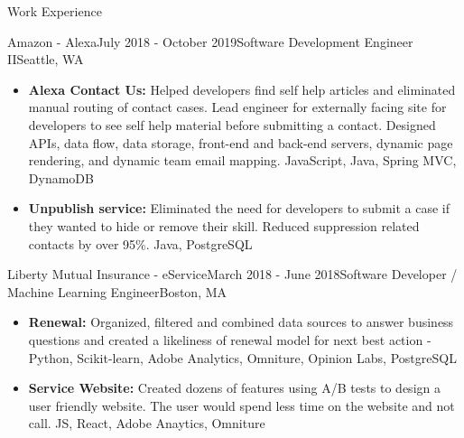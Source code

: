 \documentclass{resume} %
\begin{document}
\begin{rSection}{Work Experience}
\begin{rSubsection}{Amazon - Alexa}{July 2018 - October 2019}{Software Development Engineer II}{Seattle, WA}
\begin{itemize}
    \item \textbf{Alexa Contact Us:} Helped developers find self help articles and eliminated manual routing of contact cases. Lead engineer for externally facing site for developers to see self help material before submitting a contact. Designed APIs, data flow, data storage, front-end and back-end servers, dynamic page rendering, and dynamic team email mapping. JavaScript, Java, Spring MVC, DynamoDB
    \item \textbf{Unpublish service:} Eliminated the need for developers to submit a case if they wanted to hide or remove their skill. Reduced suppression related contacts by over 95\%. Java, PostgreSQL
\end{itemize}
\end{rSubsection}


\begin{rSubsection}{Liberty Mutual Insurance - eService}{March 2018 - June 2018}{Software Developer / Machine Learning Engineer}{Boston, MA}
\begin{itemize}
    \item \textbf{Renewal:} Organized, filtered and combined data sources to answer business questions and created a likeliness of renewal model for next best action - Python, Scikit-learn, Adobe Analytics, Omniture, Opinion Labs, PostgreSQL
    \item \textbf{Service Website:} Created dozens of features using A/B tests to design a user friendly website. The user would spend less time on the website and not call. JS, React, Adobe Anaytics, Omniture
\end{itemize}
\end{rSubsection}


\end{rSection}
\end{document}
